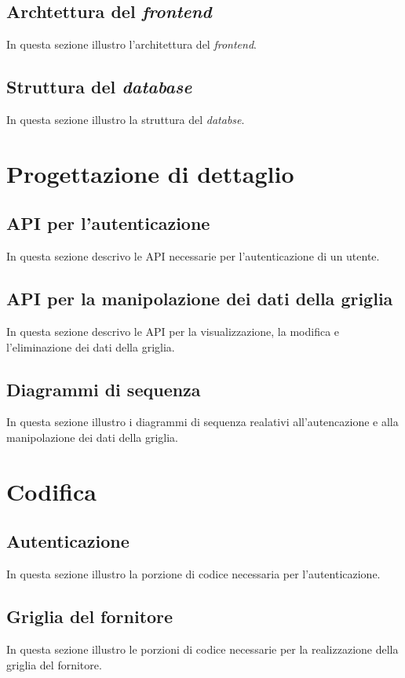 \subsection{Archtettura del \emph{frontend}}
In questa sezione illustro l'architettura del \emph{frontend}.

\subsection{Struttura del \emph{database}}
In questa sezione illustro la struttura del \emph{databse}.

\section{Progettazione di dettaglio}

\subsection{API per l'autenticazione}
In questa sezione descrivo le API necessarie per l'autenticazione di un utente.

\subsection{API per la manipolazione dei dati della griglia}
In questa sezione descrivo le API per la visualizzazione, la modifica e l'eliminazione dei dati della griglia.

\subsection{Diagrammi di sequenza}
In questa sezione illustro i diagrammi di sequenza realativi all'autencazione e alla manipolazione dei dati della griglia.

\section{Codifica}

\subsection{Autenticazione}
In questa sezione illustro la porzione di codice necessaria per l'autenticazione.

\subsection{Griglia del fornitore}
In questa sezione illustro le porzioni di codice necessarie per la realizzazione della griglia del fornitore.

